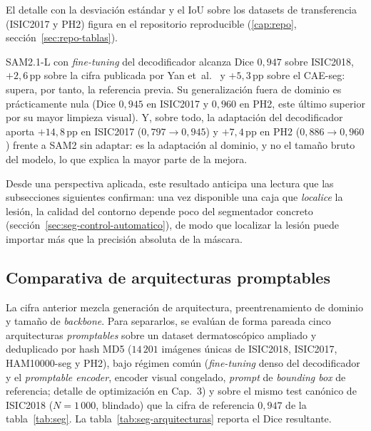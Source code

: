 El detalle con la desviación estándar y el IoU sobre los datasets de
transferencia (ISIC2017 y PH2) figura en el repositorio reproducible
(\ref{cap:repo}, sección~\ref{sec:repo-tablas}).

SAM2.1-L con \emph{fine-tuning} del decodificador alcanza Dice
$0{,}947$ sobre ISIC2018, $+2{,}6$\,pp sobre la cifra publicada por
Yan et~al.~\cite{panderm2025} y $+5{,}3$\,pp sobre el CAE-seg: supera,
por tanto, la referencia previa. Su generalización fuera de dominio es
prácticamente nula (Dice $0{,}945$ en ISIC2017 y $0{,}960$ en PH2,
este último superior por su mayor limpieza visual). Y, sobre todo, la
adaptación del decodificador aporta $+14{,}8$\,pp en ISIC2017
($0{,}797 \to 0{,}945$) y $+7{,}4$\,pp en PH2 ($0{,}886 \to 0{,}960$)
frente a SAM2 sin adaptar: es la adaptación al dominio, y no el tamaño
bruto del modelo, lo que explica la mayor parte de la mejora.

Desde una perspectiva aplicada, este resultado anticipa una lectura
que las subsecciones siguientes confirman: una vez disponible una caja
que \emph{localice} la lesión, la calidad del contorno depende poco
del segmentador concreto (sección~\ref{sec:seg-control-automatico}),
de modo que localizar la lesión puede importar más que la precisión
absoluta de la máscara.

\subsection{Comparativa de arquitecturas promptables}
\label{sec:seg-arquitecturas}

La cifra anterior mezcla generación de arquitectura, preentrenamiento
de dominio y tamaño de \emph{backbone}. Para separarlos, se evalúan de
forma pareada cinco arquitecturas \emph{promptables} sobre un dataset
dermatoscópico ampliado y deduplicado por hash MD5 ($14\,201$ imágenes
únicas de ISIC2018, ISIC2017, HAM10000-seg y PH2), bajo régimen común
(\emph{fine-tuning} denso del decodificador y el \emph{promptable
encoder}, encoder visual congelado, \emph{prompt} de \emph{bounding
box} de referencia; detalle de optimización en Cap.~3) y sobre el mismo
test canónico de ISIC2018 ($N = 1\,000$, blindado) que la cifra de
referencia $0{,}947$ de la tabla~\ref{tab:seg}. La
tabla~\ref{tab:seg-arquitecturas} reporta el Dice resultante.

